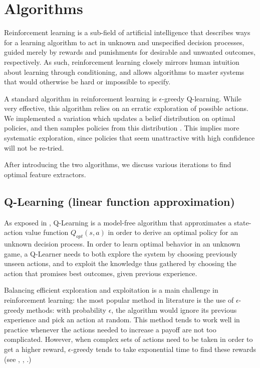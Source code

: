 \documentclass[fleqn,10pt]{SelfArx} %
\begin{document}

\section{Algorithms}

Reinforcement learning is a sub-field of artificial intelligence that describes ways for a learning algorithm to act in unknown and unspecified decision processes, guided merely by rewards and punishments for desirable and unwanted outcomes, respectively. As such, reinforcement learning closely mirrors human intuition about learning through conditioning, and allows algorithms to master systems that would otherwise be hard or impossible to specify.

A standard algorithm in reinforcement learning is $\epsilon$-greedy Q-learning. While very effective, this algorithm relies on an erratic exploration of possible actions. We implemented a variation which updates a belief distribution on optimal policies, and then samples policies from this distribution \cite{osband2014generalization}. This implies more systematic exploration, since policies that seem unattractive with high confidence will not be re-tried. 

After introducing the two algorithms, we discuss various iterations to find optimal feature extractors.

\subsection{Q-Learning (linear function approximation)}
As exposed in \cite{sutton1998reinforcement}, Q-Learning is a model-free algorithm that approximates a state-action value function $Q_{opt}(s,a)$ in order to derive an optimal policy for an unknown decision process. In order to learn optimal behavior in an unknown game, a Q-Learner needs to both explore the system by choosing previously unseen actions, and to exploit the knowledge thus gathered by choosing the action that promises best outcomes, given previous experience.

Balancing efficient exploration and exploitation is a main challenge in reinforcement learning: the most popular method in literature is the use of $\epsilon$-greedy methods: with probability $\epsilon$, the algorithm would ignore its previous experience and pick an action at random. This method tends to work well in practice whenever the actions needed to increase a payoff are not too complicated. However, when complex sets of actions need to be taken in order to get a higher reward, $\epsilon$-greedy tends to take exponential time to find these rewards (see \cite{osband2014generalization}, \cite{osband2013more}, \cite{osband2015bootstrapped}.)
\end{document}
